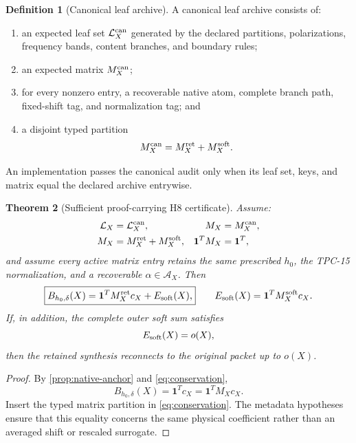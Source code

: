 \documentclass[11pt,a4paper]{article}
\newtheorem{theorem}{Theorem}[section]
\theoremstyle{definition}
\newtheorem{definition}[theorem]{Definition}
\theoremstyle{remark}
\newcommand{\one}{\mathbf 1}
\newcommand{\cA}{\mathcal A}
\newcommand{\cL}{\mathcal L}
\begin{document}
\begin{definition}[Canonical leaf archive]
A canonical leaf archive consists of:
\begin{enumerate}[label=(\alph*),leftmargin=2.2em]
\item an expected leaf set \(\cL_X^{\rm can}\) generated by the
declared partitions, polarizations, frequency bands, content branches,
and boundary rules;
\item an expected matrix \(M_X^{\rm can}\);
\item for every nonzero entry, a recoverable native atom, complete
branch path, fixed-shift tag, and normalization tag; and
\item a disjoint typed partition
\[
 M_X^{\rm can}=M_X^{\rm ret}+M_X^{\rm soft}.
\]
\end{enumerate}
An implementation passes the canonical audit only when its leaf set,
keys, and matrix equal the declared archive entrywise.
\end{definition}

\begin{theorem}[Sufficient proof-carrying H8 certificate]
\label{thm:h8}
Assume:
\begin{align}
 \cL_X&=\cL_X^{\rm can},
 &
 M_X&=M_X^{\rm can},
 \label{eq:canonical-equality}\\
 M_X&=M_X^{\rm ret}+M_X^{\rm soft},
 &
 \one^TM_X&=\one^T,
 \label{eq:conservation}
\end{align}
and assume every active matrix entry retains the same prescribed
\(h_0\), the TPC-15 normalization, and a recoverable
\(\alpha\in\cA_X\).  Then
\begin{equation}
 \boxed{
 B_{h_0,\delta}(X)
 =
 \one^TM_X^{\rm ret}c_X+
 E_{\rm soft}(X),}
 \qquad
 E_{\rm soft}(X)=\one^TM_X^{\rm soft}c_X.
 \label{eq:exact-reconnection}
\end{equation}
If, in addition, the complete outer soft sum satisfies
\[
 E_{\rm soft}(X)=o(X),
\]
then the retained synthesis reconnects to the original packet up to
\(o(X)\).
\end{theorem}

\begin{proof}
By \cref{prop:native-anchor} and \eqref{eq:conservation},
\[
 B_{h_0,\delta}(X)=\one^Tc_X=\one^TM_Xc_X.
\]
Insert the typed matrix partition in \eqref{eq:conservation}.  The
metadata hypotheses ensure that this equality concerns the same
physical coefficient rather than an averaged shift or rescaled
surrogate.
\end{proof}
\end{document}
